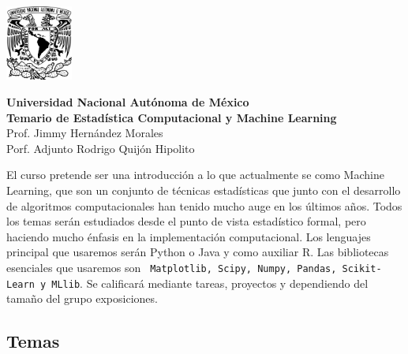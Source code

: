 \documentclass[11pt]{report}
\begin{document}
\pagestyle{fancy}

\begin{minipage}{3.8cm}
\includegraphics[width=2.2cm]{unam.pdf} 
\end{minipage}
\begin{minipage}{0.42\linewidth}
\begin{center}
{\large{\textbf{Universidad Nacional Autónoma de México}}\\\textbf{Temario de Estadística Computacional y Machine Learning}\\
Prof. Jimmy Hernández Morales\\
Porf. Adjunto  Rodrigo Quijón Hipolito}
\end{center}
\end{minipage}
\vspace{1cm}

El curso pretende ser una introducción a lo que actualmente se como Machine Learning, que son un conjunto de técnicas estadísticas que junto con el desarrollo de algoritmos computacionales han tenido mucho auge en los últimos años.  Todos los temas serán estudiados desde el punto de vista estadístico formal, pero haciendo mucho énfasis en la implementación computacional. 
Los lenguajes principal que usaremos serán Python o Java y como auxiliar R. Las bibliotecas esenciales que usaremos son \texttt{ Matplotlib, Scipy, Numpy, Pandas, Scikit-Learn y MLlib}. Se calificará mediante tareas, proyectos y dependiendo del tamaño del grupo exposiciones.

\subsection*{Temas}
\end{document}

